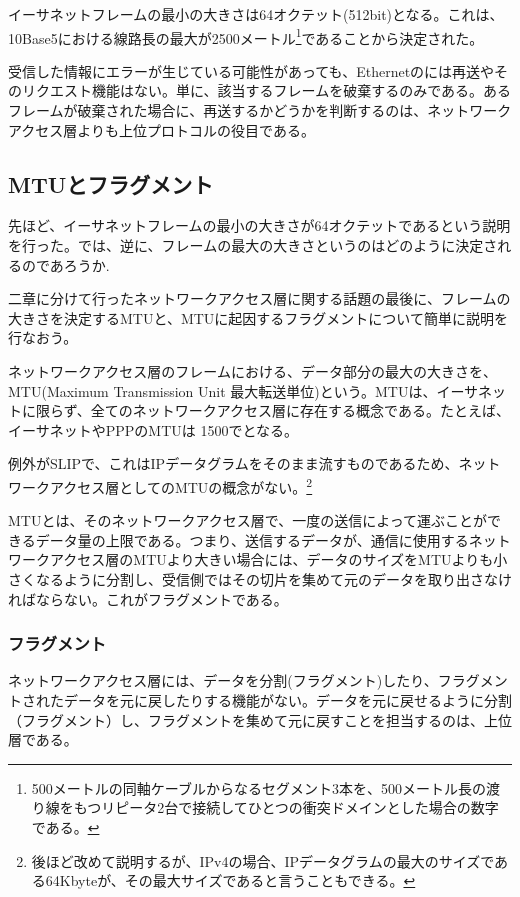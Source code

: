 イーサネットフレームの最小の大きさは64オクテット(512bit)となる。これは、10Base5における線路長の最大が2500メートル\footnote{500メートルの同軸ケーブルからなるセグメント3本を、500メートル長の渡り線をもつリピータ2台で接続してひとつの衝突ドメインとした場合の数字である。}であることから決定された。


受信した情報にエラーが生じている可能性があっても、Ethernetのには再送やそのリクエスト機能はない。単に、該当するフレームを破棄するのみである。あるフレームが破棄された場合に、再送するかどうかを判断するのは、ネットワークアクセス層よりも上位プロトコルの役目である。

\subsection{MTUとフラグメント}

先ほど、イーサネットフレームの最小の大きさが64オクテットであるという説明を行った。では、逆に、フレームの最大の大きさというのはどのように決定されるのであろうか. 

二章に分けて行ったネットワークアクセス層に関する話題の最後に、フレームの大きさを決定するMTUと、MTUに起因するフラグメントについて簡単に説明を行なおう。

ネットワークアクセス層のフレームにおける、データ部分の最大の大きさを、MTU(Maximum Transmission Unit 最大転送単位)という。MTUは、イーサネットに限らず、全てのネットワークアクセス層に存在する概念である。たとえば、イーサネットやPPPのMTUは 1500でとなる。

例外がSLIPで、これはIPデータグラムをそのまま流すものであるため、ネットワークアクセス層としてのMTUの概念がない。\footnote{後ほど改めて説明するが、IPv4の場合、IPデータグラムの最大のサイズである64Kbyteが、その最大サイズであると言うこともできる。}

MTUとは、そのネットワークアクセス層で、一度の送信によって運ぶことができるデータ量の上限である。つまり、送信するデータが、通信に使用するネットワークアクセス層のMTUより大きい場合には、データのサイズをMTUよりも小さくなるように分割し、受信側ではその切片を集めて元のデータを取り出さなければならない。これがフラグメントである。

\subsubsection{フラグメント}
ネットワークアクセス層には、データを分割(フラグメント)したり、フラグメントされたデータを元に戻したりする機能がない。データを元に戻せるように分割（フラグメント）し、フラグメントを集めて元に戻すことを担当するのは、上位層である。

